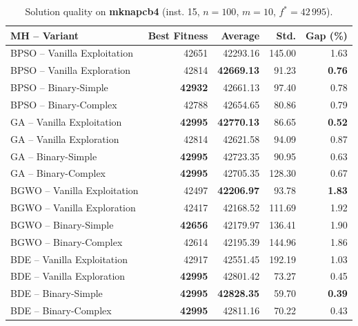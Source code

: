 \begin{table}[htbp]
  \centering
  \small
  \caption{Solution quality on \textbf{mknapcb4} (inst. 15, $n=100$, $m=10$, $f^*=42\,995$).}
  \label{tab:calidad_mknapcb4_15}
  \begin{tabular}{lrrrr}
    \toprule
    \textbf{MH -- Variant} &
    \textbf{Best Fitness} &
    \textbf{Average} &
    \textbf{Std.} &
    \textbf{Gap (\%)} \\
    \midrule
    BPSO -- Vanilla Exploitation &          42651 &         42293.16 & 145.00 &         1.63 \\
    BPSO -- Vanilla Exploration  &          42814 & \textbf{42669.13} &  91.23 & \textbf{0.76} \\
    BPSO -- Binary-Simple        & \textbf{42932} &         42661.13 &  97.40 &         0.78 \\
    BPSO -- Binary-Complex       &          42788 &         42654.65 &  80.86 &         0.79 \\
    \midrule
    GA -- Vanilla Exploitation   & \textbf{42995} & \textbf{42770.13} &  86.65 & \textbf{0.52} \\
    GA -- Vanilla Exploration    &          42814 &         42621.58 &  94.09 &         0.87 \\
    GA -- Binary-Simple          & \textbf{42995} &         42723.35 &  90.95 &         0.63 \\
    GA -- Binary-Complex         & \textbf{42995} &         42705.35 & 128.30 &         0.67 \\
    \midrule
    BGWO -- Vanilla Exploitation &          42497 & \textbf{42206.97} &  93.78 & \textbf{1.83} \\
    BGWO -- Vanilla Exploration  &          42417 &         42168.52 & 111.69 &         1.92 \\
    BGWO -- Binary-Simple        & \textbf{42656} &         42179.97 & 136.41 &         1.90 \\
    BGWO -- Binary-Complex       &          42614 &         42195.39 & 144.96 &         1.86 \\
    \midrule
    BDE -- Vanilla Exploitation  &          42917 &         42551.45 & 192.19 &         1.03 \\
    BDE -- Vanilla Exploration   & \textbf{42995} &         42801.42 &  73.27 &         0.45 \\
    BDE -- Binary-Simple         & \textbf{42995} & \textbf{42828.35} &  59.70 & \textbf{0.39} \\
    BDE -- Binary-Complex        & \textbf{42995} &         42811.16 &  70.22 &         0.43 \\
    \bottomrule
  \end{tabular}
\end{table}

